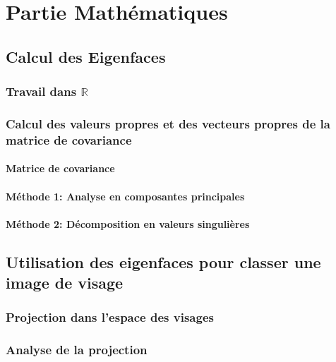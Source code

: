 \documentclass[12pt]{article}
\begin{document}
\maketitle
\newpage
\section{Partie Mathématiques}
\subsection{Calcul des Eigenfaces}
\subsubsection{Travail dans $\mathbb{R}$}
\subsubsection{Calcul des valeurs propres et des vecteurs propres de la matrice de covariance}
\paragraph{Matrice de covariance}
\paragraph{Méthode 1: Analyse en composantes principales}
\paragraph{Méthode 2: Décomposition en valeurs singulières}
\subsection{Utilisation des eigenfaces pour classer une image de visage}
\subsubsection{Projection dans l'espace des visages}
\subsubsection{Analyse de la projection}
\end{document}
